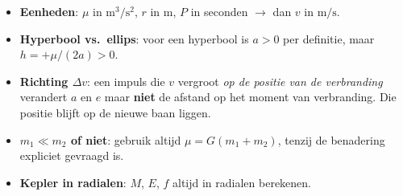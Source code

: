 \documentclass[11pt, a4paper]{article}
\begin{document}
\begin{opgelet}
\begin{itemize}[leftmargin=1.5em, itemsep=3pt]
  \item \textbf{Eenheden}: $\mu$ in $\mathrm{m^3/s^2}$, $r$ in $\mathrm{m}$, $P$ in seconden $\to$ dan $v$ in $\mathrm{m/s}$.
  \item \textbf{Hyperbool vs.\ ellips}: voor een hyperbool is $a > 0$ per definitie, maar $h = +\mu/(2a) > 0$.
  \item \textbf{Richting $\Delta v$}: een impuls die $v$ vergroot \emph{op de positie van de verbranding} verandert $a$ en $e$ maar \textbf{niet} de afstand op het moment van verbranding. Die positie blijft op de nieuwe baan liggen.
  \item \textbf{$m_1 \ll m_2$ of niet}: gebruik altijd $\mu = G(m_1 + m_2)$, tenzij de benadering expliciet gevraagd is.
  \item \textbf{Kepler in radialen}: $M$, $E$, $f$ altijd in radialen berekenen.
\end{itemize}
\end{opgelet}
\end{document}
